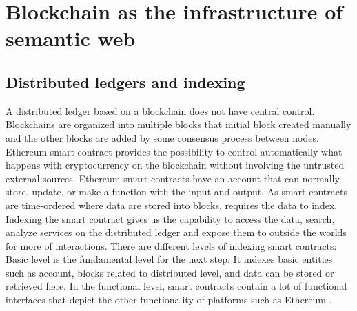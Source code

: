 \chapter{Blockchain as the infrastructure of semantic web}

\section{Distributed ledgers and indexing}
A distributed ledger based on a blockchain does not have central control. Blockchains are organized into multiple blocks that initial block created manually and the other blocks are added by some consensus process between nodes.
Ethereum smart contract provides the possibility to control automatically what happens with cryptocurrency on the blockchain without involving the untrusted external sources. Ethereum smart contracts have an account that can normally store, update, or make a function with the input and output.
As smart contracts are time-ordered where data are stored into blocks,  requires the data to index. Indexing the smart contract gives us the capability to access the data, search, analyze services on the distributed ledger and expose them to outside the worlds for more of interactions.
There are different levels of indexing smart contracts: Basic level is the fundamental level for the next step. It indexes basic entities such as account, blocks related to distributed level, and data can be stored or retrieved here. In the functional level, smart contracts contain a lot of functional interfaces that depict the other functionality of platforms such as Ethereum \cite{Third}. 


